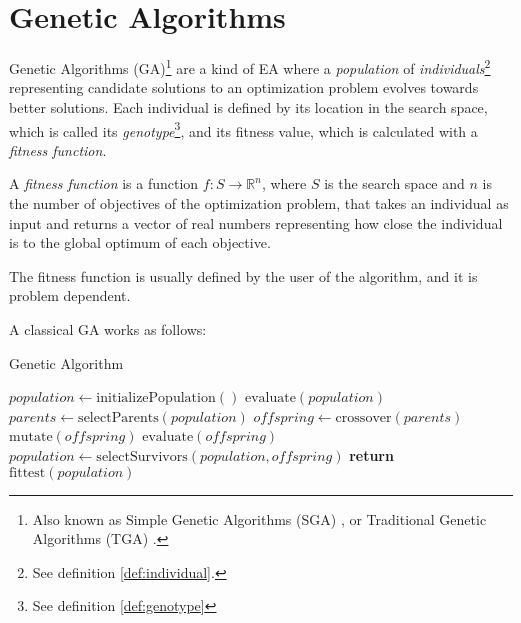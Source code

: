 \section{Genetic Algorithms}
\label{sec:genetic_algorithms}
  Genetic Algorithms (GA)\footnote{
    Also known as Simple Genetic Algorithms (SGA) 
    \autocite{yuIntroductionEvolutionaryAlgorithms2010}, or Traditional Genetic Algorithms (TGA)
    \autocite{shiffmanNatureCode2012}.
  } \autocite{hollandAdaptationNaturalArtificial1992a,kozaGeneticProgrammingProgramming1992a,yuIntroductionEvolutionaryAlgorithms2010,shiffmanNatureCode2012}
  are a kind of EA where a \emph{population} of \emph{individuals}\footnote{
    See definition \ref{def:individual}.
  } representing candidate solutions to an optimization problem evolves towards better solutions.
  Each individual is defined by its location in the search space, which is called its
  \emph{genotype}\footnote{See definition \ref{def:genotype}}, and its fitness value, which is
  calculated with a \emph{fitness function}.

  \begin{definition}
  \label{def:fitness_function}
    A \emph{fitness function} is a function \(f: S \rightarrow \mathbb{R}^n\), where \(S\) is the
    search space and \(n\) is the number of objectives of the optimization problem, that takes an
    individual as input and returns a vector of real numbers representing how close the individual 
    is to the global optimum of each objective.

    The fitness function is usually defined by the user of the algorithm, and it is problem
    dependent.
  \end{definition}

  A classical GA works as follows:

  \begin{algorithm}
    \caption{Genetic Algorithm}\label{alg:genetic_algorithm}
    \begin{algorithmic}
      \State \(\mathit{population} \gets \mathrm{initializePopulation()}\)
      \State \(\mathrm{evaluate}(\mathit{population})\)
      \Repeat
        \State \(\mathit{parents} \gets \mathrm{selectParents}(\mathit{population})\)
        \State \(\mathit{offspring} \gets \mathrm{crossover}(\mathit{parents})\)
        \State \(\mathrm{mutate}(\mathit{offspring})\)
        \State \(\mathrm{evaluate}(\mathit{offspring})\)
        \State \(\mathit{population} \gets \mathrm{selectSurvivors}(\mathit{population},
          \mathit{offspring})\)
      \State \textbf{return} \(\mathrm{fittest}(\mathit{population})\)
    \end{algorithmic}
  \end{algorithm}